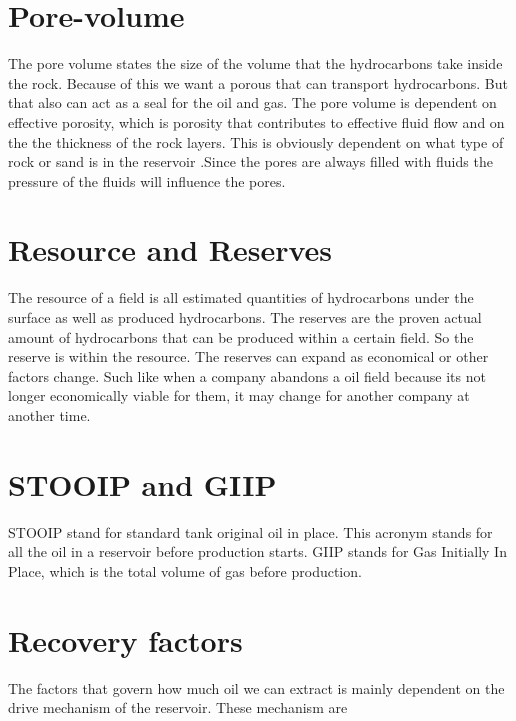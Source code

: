 \documentclass[DIV=calc, paper=a4, fontsize=11pt, twocolumn]{scrartcl}	 %
\begin{document}
\section*{Pore-volume}
The pore volume states the size of the volume that the hydrocarbons take inside the rock. Because of this we want a porous that can transport hydrocarbons. But that also can act as a seal for the oil and gas. The pore volume is dependent on effective porosity, which is porosity that contributes to effective fluid flow and on the the thickness of the rock layers. This is obviously dependent on what type of rock or sand is in the reservoir .Since the pores are always filled with fluids the pressure of the fluids will influence the pores.


\section*{Resource and Reserves}
The resource of a field is all estimated quantities of hydrocarbons under the surface as well as produced hydrocarbons. The reserves are the proven actual amount of hydrocarbons that can be produced within a certain field. So the reserve is within the resource. The reserves can expand as economical or other factors change. Such like when a company abandons a oil field because its not longer economically viable for them, it may change for another company at another time.
\section*{STOOIP and GIIP}
STOOIP stand for standard tank original oil in place. This acronym stands for all the oil in a reservoir before production starts. GIIP stands for Gas Initially In Place, which is the total volume of gas before production.

\section*{Recovery factors}
The factors that govern how much oil we can extract is mainly dependent on the drive mechanism of the reservoir. These mechanism are
\end{document}
